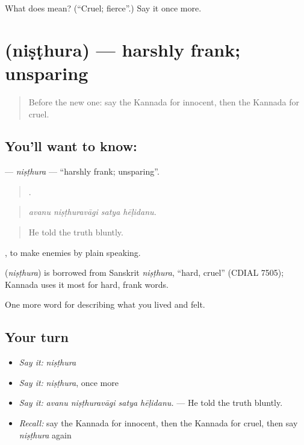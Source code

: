 \begin{tcolorbox}[breakable,colback=teal!4,colframe=teal!35!black,title={Before you move on}]
What does  mean? (\textquotedblleft{}Cruel; fierce\textquotedblright{}.) Say it once more.
\end{tcolorbox}
\section[\texorpdfstring{\kn{ನಿಷ್ಠುರ} (niṣṭhura)}{ನಿಷ್ಠುರ (niṣṭhura)}]{ (niṣṭhura) — harshly frank; unsparing}

\label{lesson:KA-C501-nisthura}



\begin{quote}
Before the new one: say the Kannada for innocent, then the Kannada for cruel.
\end{quote}

\subsection*{You'll want to know: }
\textbf{} — \emph{niṣṭhura} — \textquotedblleft{}harshly frank; unsparing\textquotedblright{}.

\begin{quote}
   .
\end{quote}

\begin{quote}
\emph{avanu niṣṭhuravāgi satya hēḷidanu.}
\end{quote}

\begin{quote}
He told the truth bluntly.
\end{quote}

 , to make enemies by plain speaking.

\begin{cousinweb}
\textbf{} (\emph{niṣṭhura}) is borrowed from Sanskrit \emph{niṣṭhura}, \textquotedblleft{}hard, cruel\textquotedblright{} (CDIAL 7505); Kannada uses it most for hard, frank words.
\end{cousinweb}

\begin{grammarlens}[title={What you've built}]
One more word for describing what you lived and felt.
\end{grammarlens}

\subsection*{Your turn}
\begin{itemize}
\raggedright
  \item \emph{Say it:} \emph{niṣṭhura}
  \item \emph{Say it:} \emph{niṣṭhura}, once more
  \item \emph{Say it:} \emph{avanu niṣṭhuravāgi satya hēḷidanu.} — He told the truth bluntly.
  \item \emph{Recall:} say the Kannada for innocent, then the Kannada for cruel, then say \emph{niṣṭhura} again
\end{itemize}

